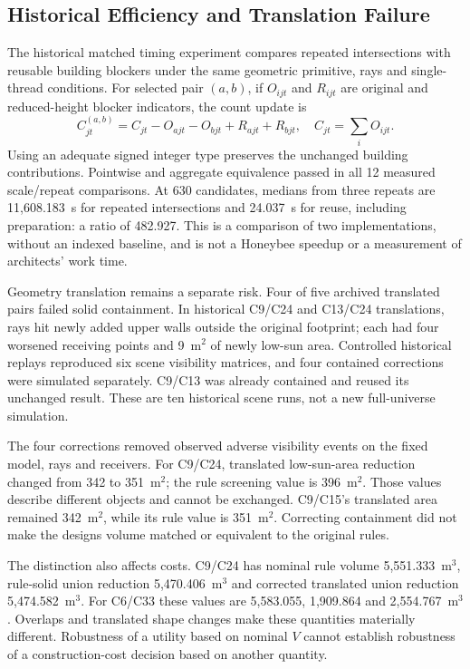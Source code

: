 \documentclass{llncs}
\begin{document}
\subsection{Historical Efficiency and Translation Failure}
The historical matched timing experiment compares repeated intersections with reusable building blockers under the same geometric primitive, rays and single-thread conditions. For selected pair $(a,b)$, if $O_{ijt}$ and $R_{ijt}$ are original and reduced-height blocker indicators, the count update is
\begin{equation}
 C_{jt}^{(a,b)}=C_{jt}-O_{ajt}-O_{bjt}+R_{ajt}+R_{bjt},\quad C_{jt}=\sum_i O_{ijt}.
\label{eq:blocker}
\end{equation}
Using an adequate signed integer type preserves the unchanged building contributions. Pointwise and aggregate equivalence passed in all 12 measured scale/repeat comparisons. At 630 candidates, medians from three repeats are 11,608.183~s for repeated intersections and 24.037~s for reuse, including preparation: a ratio of 482.927. This is a comparison of two implementations, without an indexed baseline, and is not a Honeybee speedup or a measurement of architects' work time.

Geometry translation remains a separate risk. Four of five archived translated pairs failed solid containment. In historical C9/C24 and C13/C24 translations, rays hit newly added upper walls outside the original footprint; each had four worsened receiving points and 9~m$^2$ of newly low-sun area. Controlled historical replays reproduced six scene visibility matrices, and four contained corrections were simulated separately. C9/C13 was already contained and reused its unchanged result. These are ten historical scene runs, not a new full-universe simulation.

The four corrections removed observed adverse visibility events on the fixed model, rays and receivers. For C9/C24, translated low-sun-area reduction changed from 342 to 351~m$^2$; the rule screening value is 396~m$^2$. Those values describe different objects and cannot be exchanged. C9/C15's translated area remained 342~m$^2$, while its rule value is 351~m$^2$. Correcting containment did not make the designs volume matched or equivalent to the original rules.

The distinction also affects costs. C9/C24 has nominal rule volume 5,551.333~m$^3$, rule-solid union reduction 5,470.406~m$^3$ and corrected translated union reduction 5,474.582~m$^3$. For C6/C33 these values are 5,583.055, 1,909.864 and 2,554.767~m$^3$. Overlaps and translated shape changes make these quantities materially different. Robustness of a utility based on nominal $V$ cannot establish robustness of a construction-cost decision based on another quantity.
\end{document}
